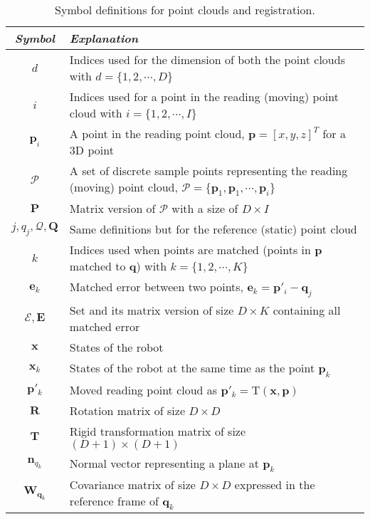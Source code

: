 \documentclass[12pt,letterpaper,oneside]{article}
\begin{document}
\begin{table}[htbp]
\centering
\caption{Symbol definitions for point clouds and registration.}
\label{tab:pointCloudSymbols}
\begin{tabu}{cX}

\toprule
\emph{Symbol} & \emph{Explanation} \\
\midrule

$d$ & Indices used for the dimension of both the point clouds with $d = \{1,2, \cdots, D\}$ \\
$i$ & Indices used for a point in the reading (moving) point cloud with $i = \{1,2, \cdots, I\}$\\
$\bm{p}_i$ & A point in the reading point cloud, $\bm{p} = [x, y, z]^T$ for a 3D point\\
$\mathcal{P}$ & A set of discrete sample points representing the reading (moving) point cloud,  $\mathcal{P} = \{\bm{p}_1, \bm{p}_1, \cdots, \bm{p}_i\}$ \\
$\bm{P}$ & Matrix version of $\mathcal{P}$ with a size of $D \times I$ \\

$j, q_j, \mathcal{Q}, \bm{Q}$ & Same definitions but for the reference (static) point cloud \\

$k$ & Indices used when points are matched (points in $\bm{p}$ matched to $\bm{q}$) with $k = \{1,2, \cdots, K\}$\\
$\bm{e}_k$ & Matched error between two points, $\bm{e}_k = \bm{p}'_i - \bm{q}_j$ \\
$\mathcal{E}, \bm{E}$ & Set and its matrix version of size $D \times K$ containing all matched error \\

$\bm{x}$ & States of the robot \\
$\bm{x}_k$ & States of the robot at the same time as the point $\bm{p}_k$ \\
$\bm{p}'_k$ & Moved reading point cloud as  $\bm{p}'_k = \mathrm{T}(\bm{x}, \bm{p})$ \\
$\bm{R}$ & Rotation matrix of size $D \times D$ \\
$\bm{T}$ & Rigid transformation matrix of size $(D+1) \times (D+1)$ \\
$\bm{n}_{q_k}$ & Normal vector representing a plane at $\bm{p}_k$ \\
$\bm{W}_{\bm{q}_k}$ & Covariance matrix of size $D \times D$ expressed in the reference frame of $\bm{q}_k$\\
\bottomrule

\end{tabu}
\end{table}
\end{document}
